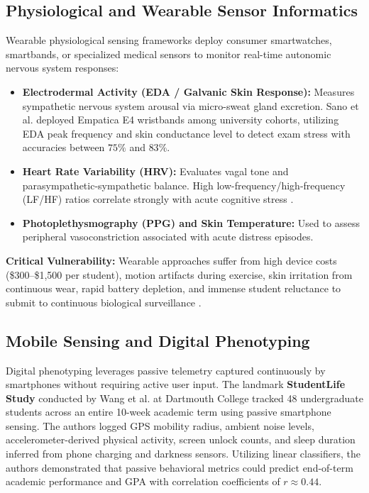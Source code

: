 \documentclass[12pt,a4paper,oneside]{report}
\begin{document}
\subsection{Physiological and Wearable Sensor Informatics}
Wearable physiological sensing frameworks deploy consumer smartwatches, smartbands, or specialized medical sensors to monitor real-time autonomic nervous system responses:
\begin{itemize}
    \item \textbf{Electrodermal Activity (EDA / Galvanic Skin Response):} Measures sympathetic nervous system arousal via micro-sweat gland excretion. Sano et al. \cite{sano2018} deployed Empatica E4 wristbands among university cohorts, utilizing EDA peak frequency and skin conductance level to detect exam stress with accuracies between $75\%$ and $83\%$.
    \item \textbf{Heart Rate Variability (HRV):} Evaluates vagal tone and parasympathetic-sympathetic balance. High low-frequency/high-frequency (LF/HF) ratios correlate strongly with acute cognitive stress \cite{akbari2021}.
    \item \textbf{Photoplethysmography (PPG) and Skin Temperature:} Used to assess peripheral vasoconstriction associated with acute distress episodes.
\end{itemize}
\noindent
\textbf{Critical Vulnerability:} Wearable approaches suffer from high device costs (\$300--\$1,500 per student), motion artifacts during exercise, skin irritation from continuous wear, rapid battery depletion, and immense student reluctance to submit to continuous biological surveillance \cite{bano2022}.

\subsection{Mobile Sensing and Digital Phenotyping}
Digital phenotyping leverages passive telemetry captured continuously by smartphones without requiring active user input. The landmark \textbf{StudentLife Study} conducted by Wang et al. \cite{wang2014studentlife} at Dartmouth College tracked 48 undergraduate students across an entire 10-week academic term using passive smartphone sensing. The authors logged GPS mobility radius, ambient noise levels, accelerometer-derived physical activity, screen unlock counts, and sleep duration inferred from phone charging and darkness sensors. Utilizing linear classifiers, the authors demonstrated that passive behavioral metrics could predict end-of-term academic performance and GPA with correlation coefficients of $r \approx 0.44$. 
\end{document}
